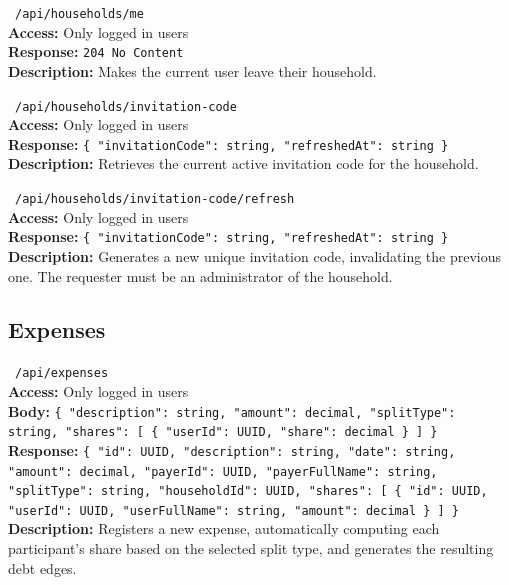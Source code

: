 \vspace{0.3cm}
\noindent \apiDELETE\ \texttt{/api/households/me} \\
\textbf{Access:} Only logged in users \\
\textbf{Response:} \texttt{204 No Content} \\
\textbf{Description:} Makes the current user leave their household.

\vspace{0.3cm}
\noindent \apiGET\ \texttt{/api/households/invitation-code} \\
\textbf{Access:} Only logged in users \\
\textbf{Response:} \texttt{\{ "invitationCode": string, "refreshedAt": string \}} \\
\textbf{Description:} Retrieves the current active invitation code for the household.

\vspace{0.3cm}
\noindent \apiPOST\ \texttt{/api/households/invitation-code/refresh} \\
\textbf{Access:} Only logged in users \\
\textbf{Response:} \texttt{\{ "invitationCode": string, "refreshedAt": string \}} \\
\textbf{Description:} Generates a new unique invitation code, invalidating the previous one. The requester must be an administrator of the household.

\subsection{Expenses}

\vspace{0.3cm}
\noindent \apiPOST\ \texttt{/api/expenses} \\
\textbf{Access:} Only logged in users \\
\textbf{Body:} \texttt{\{ "description": string, "amount": decimal, "splitType": string, "shares": [ \{ "userId": UUID, "share": decimal \} ] \}} \\
\textbf{Response:} \texttt{\{ "id": UUID, "description": string, "date": string, "amount": decimal, "payerId": UUID, "payerFullName": string, "splitType": string, "householdId": UUID, "shares": [ \{ "id": UUID, "userId": UUID, "userFullName": string, "amount": decimal \} ] \}} \\
\textbf{Description:} Registers a new expense, automatically computing each participant's share based on the selected split type, and generates the resulting debt edges.

